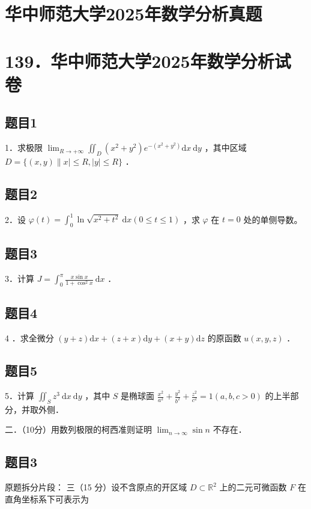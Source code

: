 \documentclass{article}
\begin{document}
\section*{华中师范大学2025年数学分析真题}
\section*{139．华中师范大学2025年数学分析试卷}

\subsection{题目1}
1．求极限 \(\lim _{R \rightarrow+\infty} \iint_{D}\left(x^{2}+y^{2}\right) e^{-\left(x^{2}+y^{2}\right)} \mathrm{d} x \mathrm{~d} y\) ，其中区域 \(D=\{(x, y) \| x|\leq R,|y| \leq R\}\) ．

\subsection{题目2}
2．设 \(\varphi(t)=\int_{0}^{1} \ln \sqrt{x^{2}+t^{2}} \mathrm{~d} x(0 \leq t \leq 1)\) ，求 \(\varphi\) 在 \(t=0\) 处的单侧导数。

\subsection{题目3}
3．计算 \(J=\int_{0}^{\pi} \frac{x \sin x}{1+\cos ^{2} x} \mathrm{~d} x\) ．

\subsection{题目4}
4 ．求全微分 \((y+z) \mathrm{d} x+(z+x) \mathrm{d} y+(x+y) \mathrm{d} z\) 的原函数 \(u(x, y, z)\) ．

\subsection{题目5}
5．计算 \(\iint_{S} z^{3} \mathrm{~d} x \mathrm{~d} y\) ，其中 \(S\) 是椭球面 \(\frac{x^{2}}{a^{2}}+\frac{y^{2}}{b^{2}}+\frac{z^{2}}{c^{2}}=1(a, b, c>0)\) 的上半部分，并取外侧．

二．（10分）用数列极限的柯西准则证明 \(\lim _{n \rightarrow \infty} \sin n\) 不存在．\\

\subsection{题目3}
原题拆分片段：
三（15 分）设不含原点的开区域 \(D \subset \mathbb{R}^{2}\) 上的二元可微函数 \(F\) 在直角坐标系下可表示为
\end{document}
